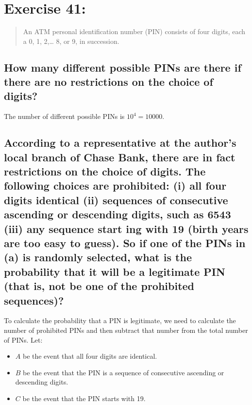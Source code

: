 \newpage
\section{Exercise 41:}
\begin{quote}
    An ATM personal identification number (PIN) consists of four digits, each a 0, 1, 2,… 8, or 9, in succession.
\end{quote}

\subsection{How many different possible PINs are there if there are no restrictions on the choice of digits?}
The number of different possible PINs is \(10^4 = 10000\).

\subsection{According to a representative at the author's local branch of Chase Bank, there are in fact restrictions on the choice of digits. The following choices are prohibited: (i) all four digits identical (ii) sequences of consecutive ascending or descending digits, such as 6543 (iii) any sequence start ing with 19 (birth years are too easy to guess). So if one of the PINs in (a) is randomly selected, what is the probability that it will be a legitimate PIN (that is, not be one of the prohibited sequences)?}

To calculate the probability that a PIN is legitimate, we need to calculate the number of prohibited PINs and then subtract that number from the total number of PINs.
Let:
\begin{itemize}
    \item \(A\) be the event that all four digits are identical.
    \item \(B\) be the event that the PIN is a sequence of consecutive ascending or descending digits.
    \item \(C\) be the event that the PIN starts with 19.
\end{itemize}

